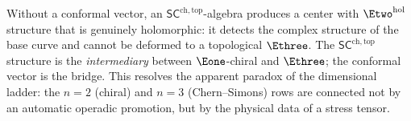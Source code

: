 \begin{remark}
\label{rem:conformal-vector-necessary}
Without a conformal vector, an
$\mathsf{SC}^{\mathrm{ch,top}}$-algebra produces a center
with $\Etwo^{\mathrm{hol}}$ structure that is genuinely
holomorphic: it detects the complex structure of the base
curve and cannot be deformed to a topological $\Ethree$.
The $\mathsf{SC}^{\mathrm{ch,top}}$ structure is the
\emph{intermediary} between
$\Eone$-chiral and $\Ethree$; the conformal vector is
the bridge. This resolves the apparent paradox of the
dimensional ladder: the $n = 2$ (chiral) and $n = 3$
(Chern--Simons) rows are connected not by an automatic
operadic promotion, but by the physical data of a stress
tensor.
\end{remark}

